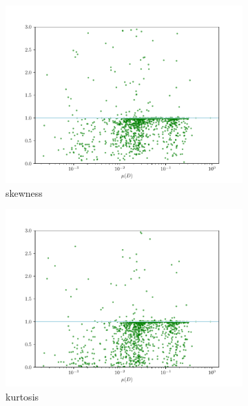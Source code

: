 \documentclass[12pt,a4paper,automark, toc=bib]{scrreprt}
\theoremstyle{definition}
\begin{document}
\begin{figure}
\begin{subfigure}{0.32\linewidth}
			\includegraphics[width=\linewidth]{figures/stat_sha384_0skew_div.pdf}
			\caption{skewness}
		\end{subfigure}
		\begin{subfigure}{0.32\linewidth}
			\includegraphics[width=\linewidth]{figures/stat_sha384_0kurtosis_div.pdf}
			\caption{kurtosis}
		\end{subfigure}
		\begin{subfigure}{0.32\linewidth}

\end{subfigure}
\end{figure}
\end{document}
